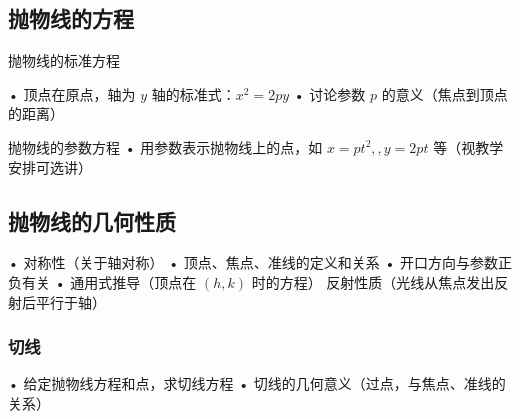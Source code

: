 \subsection{抛物线的方程}
\begin{theorem}{抛物线的标准方程}

\end{theorem}
	•	顶点在原点，轴为 $y$ 轴的标准式：$x^2=2py$
	•	讨论参数 $p$ 的意义（焦点到顶点的距离）
\begin{theorem}{抛物线的参数方程}
	•	用参数表示抛物线上的点，如 $x=pt^2,,y=2pt$ 等（视教学安排可选讲）
\end{theorem}

\subsection{抛物线的几何性质}
	•	对称性（关于轴对称）
	•	顶点、焦点、准线的定义和关系
	•	开口方向与参数正负有关
	•	通用式推导（顶点在 $(h,k)$ 时的方程）
    反射性质（光线从焦点发出反射后平行于轴）
\subsubsection{切线}
	•	给定抛物线方程和点，求切线方程
	•	切线的几何意义（过点，与焦点、准线的关系）
